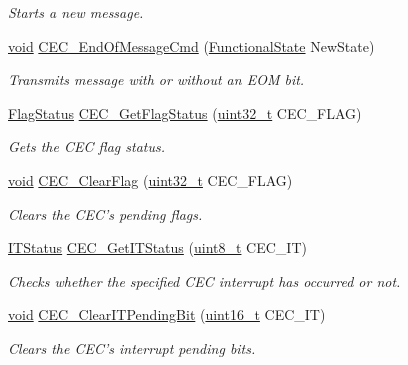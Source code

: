 \begin{DoxyCompactItemize}
\begin{DoxyCompactList}\small\item\em Starts a new message. \end{DoxyCompactList}\item 
\hyperlink{group___n_a_m_e_ga18028b8badbf1ea7e704ccac3c488e82}{void} \hyperlink{group___c_e_c___exported___functions_ga1e2cf6e3a1ac891f2814f9d3f4043574}{C\-E\-C\-\_\-\-End\-Of\-Message\-Cmd} (\hyperlink{group___exported__types_gac9a7e9a35d2513ec15c3b537aaa4fba1}{Functional\-State} New\-State)
\begin{DoxyCompactList}\small\item\em Transmits message with or without an E\-O\-M bit. \end{DoxyCompactList}\item 
\hyperlink{group___exported__types_ga89136caac2e14c55151f527ac02daaff}{Flag\-Status} \hyperlink{group___c_e_c___exported___functions_gaf920706cb350182bf0728c66868053ca}{C\-E\-C\-\_\-\-Get\-Flag\-Status} (\hyperlink{stdint_8h_a435d1572bf3f880d55459d9805097f62}{uint32\-\_\-t} C\-E\-C\-\_\-\-F\-L\-A\-G)
\begin{DoxyCompactList}\small\item\em Gets the C\-E\-C flag status. \end{DoxyCompactList}\item 
\hyperlink{group___n_a_m_e_ga18028b8badbf1ea7e704ccac3c488e82}{void} \hyperlink{group___c_e_c___exported___functions_ga928b373fb5972204c56f9c64113f8c67}{C\-E\-C\-\_\-\-Clear\-Flag} (\hyperlink{stdint_8h_a435d1572bf3f880d55459d9805097f62}{uint32\-\_\-t} C\-E\-C\-\_\-\-F\-L\-A\-G)
\begin{DoxyCompactList}\small\item\em Clears the C\-E\-C's pending flags. \end{DoxyCompactList}\item 
\hyperlink{group___exported__types_gaacbd7ed539db0aacd973a0f6eca34074}{I\-T\-Status} \hyperlink{group___c_e_c___exported___functions_gaa1940a388d0bfcefe7483fb74cc2ba1d}{C\-E\-C\-\_\-\-Get\-I\-T\-Status} (\hyperlink{stdint_8h_aba7bc1797add20fe3efdf37ced1182c5}{uint8\-\_\-t} C\-E\-C\-\_\-\-I\-T)
\begin{DoxyCompactList}\small\item\em Checks whether the specified C\-E\-C interrupt has occurred or not. \end{DoxyCompactList}\item 
\hyperlink{group___n_a_m_e_ga18028b8badbf1ea7e704ccac3c488e82}{void} \hyperlink{group___c_e_c___exported___functions_gade646921262a077172c708953822f248}{C\-E\-C\-\_\-\-Clear\-I\-T\-Pending\-Bit} (\hyperlink{stdint_8h_a273cf69d639a59973b6019625df33e30}{uint16\-\_\-t} C\-E\-C\-\_\-\-I\-T)
\begin{DoxyCompactList}\small\item\em Clears the C\-E\-C's interrupt pending bits. \end{DoxyCompactList}\end{DoxyCompactItemize}



